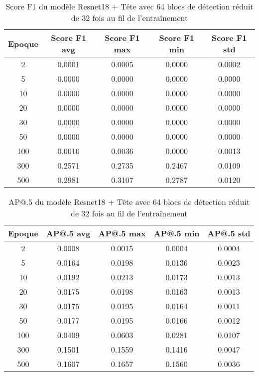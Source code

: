 \begin{table}[!ht]
    \caption{Score F1 du modèle Resnet18 + Tête avec 64 blocs de détection réduit de 32 fois au fil de l'entraînement}
    \label{tab:resnet18+head_64n_reduced_32x_f1score}
    \centering
    \begin{tabular}{ |c||c|c|c|c|  }
        \hline
        \rowcolor{gray!50}
        Epoque & Score F1 avg & Score F1 max & Score F1 min & Score F1 std\\
        \hline
        2 & 0.0001 & 0.0005 & 0.0000 & 0.0002\\
        5 & 0.0000 & 0.0000 & 0.0000 & 0.0000\\
        10 & 0.0000 & 0.0000 & 0.0000 & 0.0000\\
        20 & 0.0000 & 0.0000 & 0.0000 & 0.0000\\
        30 & 0.0000 & 0.0000 & 0.0000 & 0.0000\\
        50 & 0.0000 & 0.0000 & 0.0000 & 0.0000\\
        100 & 0.0010 & 0.0036 & 0.0000 & 0.0013\\
        300 & 0.2571 & 0.2735 & 0.2467 & 0.0109\\
        500 & 0.2981 & 0.3107 & 0.2787 & 0.0120\\
        \hline
    \end{tabular}
\end{table}

\begin{table}[!ht]
    \caption{AP@.5 du modèle Resnet18 + Tête avec 64 blocs de détection réduit de 32 fois au fil de l'entraînement}
    \label{tab:resnet18+head_64n_reduced_32x_ap50}
    \centering
    \begin{tabular}{ |c||c|c|c|c|  }
        \hline
        \rowcolor{gray!50}
        Epoque & AP@.5 avg & AP@.5 max & AP@.5 min & AP@.5 std\\
        \hline
        2 & 0.0008 & 0.0015 & 0.0004 & 0.0004\\
        5 & 0.0164 & 0.0198 & 0.0136 & 0.0023\\
        10 & 0.0192 & 0.0213 & 0.0173 & 0.0013\\
        20 & 0.0175 & 0.0198 & 0.0163 & 0.0013\\
        30 & 0.0175 & 0.0195 & 0.0164 & 0.0011\\
        50 & 0.0177 & 0.0195 & 0.0166 & 0.0012\\
        100 & 0.0409 & 0.0603 & 0.0281 & 0.0107\\
        300 & 0.1501 & 0.1559 & 0.1416 & 0.0047\\
        500 & 0.1607 & 0.1657 & 0.1560 & 0.0036\\
        \hline
    \end{tabular}
\end{table}

